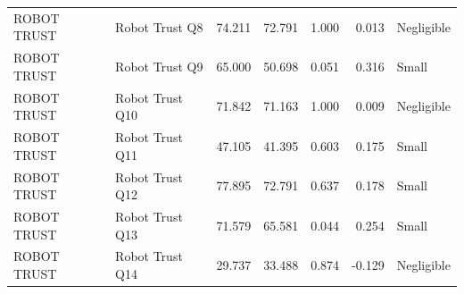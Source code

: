\begin{table}
\begin{tabular}{llrrrrl}
ROBOT TRUST & Robot Trust Q8 & 74.211 & 72.791 & 1.000 & 0.013 & Negligible \\
ROBOT TRUST & Robot Trust Q9 & 65.000 & 50.698 & 0.051 & 0.316 & Small \\
ROBOT TRUST & Robot Trust Q10 & 71.842 & 71.163 & 1.000 & 0.009 & Negligible \\
ROBOT TRUST & Robot Trust Q11 & 47.105 & 41.395 & 0.603 & 0.175 & Small \\
ROBOT TRUST & Robot Trust Q12 & 77.895 & 72.791 & 0.637 & 0.178 & Small \\
ROBOT TRUST & Robot Trust Q13 & 71.579 & 65.581 & 0.044 & 0.254 & Small \\
ROBOT TRUST & Robot Trust Q14 & 29.737 & 33.488 & 0.874 & -0.129 & Negligible \\
\bottomrule
\end{tabular}
\end{table}
